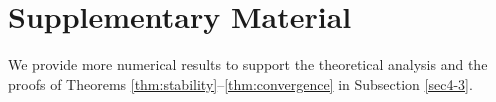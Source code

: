 \documentclass[10pt]{siamltex}
\newcommand{\abs}[1]{\left\vert#1\right\vert}
\begin{document}








\newpage
{}

\setcounter{section}{0}
\setcounter{thm}{0}
\def\thesection{\alph{section}} %
\section{Supplementary Material}
We provide more numerical results to support the theoretical analysis and the proofs of Theorems \ref{thm:stability}--\ref{thm:convergence} in Subsection \ref{sec4-3}.

%

\iffalse
\end{document}
